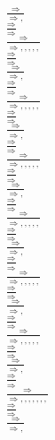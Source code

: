 \documentclass[11pt]{article}
\begin{document}
\begin{center}
\\$\frac{\Rightarrow }{\Rightarrow , }$
\bigskip
\\$\frac{\Rightarrow }{\Rightarrow }$
\bigskip
\\$\frac{\Rightarrow }{\Rightarrow , , , , , }$
\bigskip
\\$\frac{\Rightarrow }{\Rightarrow }$
\bigskip
\\$\frac{\Rightarrow }{\Rightarrow , }$
\bigskip
\\$\frac{\Rightarrow }{\Rightarrow }$
\bigskip
\\$\frac{\Rightarrow }{\Rightarrow , , , , , }$
\bigskip
\\$\frac{\Rightarrow }{\Rightarrow }$
\bigskip
\\$\frac{\Rightarrow }{\Rightarrow , }$
\bigskip
\\$\frac{\Rightarrow }{\Rightarrow }$
\bigskip
\\$\frac{\Rightarrow }{\Rightarrow , , , , , }$
\bigskip
\\$\frac{\Rightarrow }{\Rightarrow }$
\bigskip
\\$\frac{\Rightarrow }{\Rightarrow , }$
\bigskip
\\$\frac{\Rightarrow }{\Rightarrow }$
\bigskip
\\$\frac{\Rightarrow }{\Rightarrow , , , , , }$
\bigskip
\\$\frac{\Rightarrow }{\Rightarrow }$
\bigskip
\\$\frac{\Rightarrow }{\Rightarrow , }$
\bigskip
\\$\frac{\Rightarrow }{\Rightarrow }$
\bigskip
\\$\frac{\Rightarrow }{\Rightarrow , , , , , }$
\bigskip
\\$\frac{\Rightarrow }{\Rightarrow }$
\bigskip
\\$\frac{\Rightarrow }{\Rightarrow , }$
\bigskip
\\$\frac{\Rightarrow }{\Rightarrow }$
\bigskip
\\$\frac{\Rightarrow }{\Rightarrow , , , , , }$
\bigskip
\\$\frac{\Rightarrow }{\Rightarrow }$
\bigskip
\\$\frac{\Rightarrow }{\Rightarrow , }$
\bigskip
\\$\frac{\Rightarrow }{\Rightarrow }$
\bigskip
\\$\frac{\Rightarrow }{\Rightarrow , , , , , , , }$
\bigskip
\\$\frac{\Rightarrow }{\Rightarrow }$
\bigskip
\\$\frac{\Rightarrow }{\Rightarrow , }$

\end{center}
\end{document}
